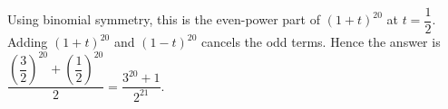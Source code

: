 Using binomial symmetry, this is the even-power part of $(1+t)^{20}$ at $t=\dfrac{1}{2}$. Adding $(1+t)^{20}$ and $(1-t)^{20}$ cancels the odd terms. Hence the answer is $\dfrac{(\dfrac{3}{2})^{20}+(\dfrac{1}{2})^{20}}{2}=\boxed{\dfrac{3^{20}+1}{2^{21}}}$.
